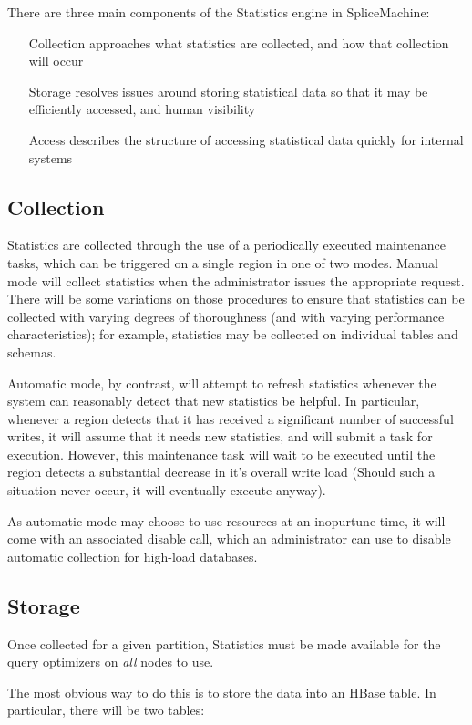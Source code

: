 There are three main components of the Statistics engine in SpliceMachine:
\begin{enumerate}
\item[Collection] approaches what statistics are collected, and how that collection will occur
\item[Storage] resolves issues around storing statistical data so that it may be efficiently accessed, and human visibility
\item[Access] describes the structure of accessing statistical data quickly for internal systems
\end{enumerate}

\subsection{Collection} 
Statistics are collected through the use of a periodically executed maintenance tasks, which can be triggered on a single region in one of two modes. Manual mode will collect statistics when the administrator issues the appropriate request. There will be some variations on those procedures to ensure that statistics can be collected with varying degrees of thoroughness (and with varying performance characteristics); for example, statistics may be collected on individual tables and schemas.

Automatic mode, by contrast, will attempt to refresh statistics whenever the system can reasonably detect that new statistics be helpful. In particular, whenever a region detects that it has received a significant number of successful writes, it will assume that it needs new statistics, and will submit a task for execution. However, this maintenance task will wait to be executed until the region detects a substantial decrease in it's overall write load (Should such a situation never occur, it will eventually execute anyway).

As automatic mode may choose to use resources at an inopurtune time, it will come with an associated disable call, which an administrator can use to disable automatic collection for high-load databases.  

\subsection{Storage}
Once collected for a given partition, Statistics must be made available for the query optimizers on \emph{all} nodes to use. 

The most obvious way to do this is to store the data into an HBase table. In particular, there will be two tables: 

